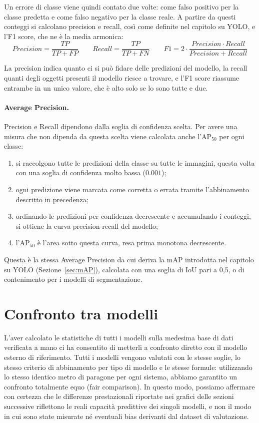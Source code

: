 \noindent
Un errore di classe viene quindi contato due volte: come falso positivo per la classe predetta e come falso negativo per la classe reale.
A partire da questi conteggi si calcolano precision e recall, così come definite nel capitolo su YOLO, e l'F1 score, che ne è la media armonica:
$$ Precision = \frac{TP}{TP + FP} \qquad Recall = \frac{TP}{TP + FN} \qquad F1 = 2 \cdot \frac{Precision \cdot Recall}{Precision + Recall} $$

\noindent
La precision indica quanto ci si può fidare delle predizioni del modello, la recall quanti degli oggetti presenti il modello riesce a trovare, e l'F1 score riassume
entrambe in un unico valore, che è alto solo se lo sono tutte e due.

\paragraph{Average Precision.}
Precision e Recall dipendono dalla soglia di confidenza scelta. Per avere una misura che non dipenda da questa scelta viene calcolata anche l'AP$_{50}$ per ogni classe:
\begin{enumerate}
  \item si raccolgono tutte le predizioni della classe su tutte le immagini, questa volta con una soglia di confidenza molto bassa ($0.001$);
  \item ogni predizione viene marcata come corretta o errata tramite l'abbinamento descritto in precedenza;
  \item ordinando le predizioni per confidenza decrescente e accumulando i conteggi, si ottiene la curva precision-recall del modello;
  \item l'AP$_{50}$ è l'area sotto questa curva, resa prima monotona decrescente.
\end{enumerate}

Questa è la stessa Average Precision da cui deriva la mAP introdotta nel capitolo su YOLO (Sezione~\ref{sec:mAP}), calcolata con una soglia di IoU pari a 0,5, o di contenimento per i modelli di segmentazione.

\newpage

\section{Confronto tra modelli}

\noindent
L'aver calcolato le statistiche di tutti i modelli sulla medesima base di dati verificata a mano ci ha consentito di metterli a confronto diretto con il modello esterno di riferimento.
Tutti i modelli vengono valutati con le stesse soglie, lo stesso criterio di abbinamento per tipo di modello e le stesse formule: utilizzando lo stesso identico metro di paragone per ogni sistema,
abbiamo garantito un confronto totalmente equo (fair comparison). In questo modo, possiamo affermare con certezza che le differenze prestazionali riportate nei grafici delle sezioni successive
riflettono le reali capacità predittive dei singoli modelli, e non il modo in cui sono state misurate né eventuali bias derivanti dal dataset di valutazione. \\

